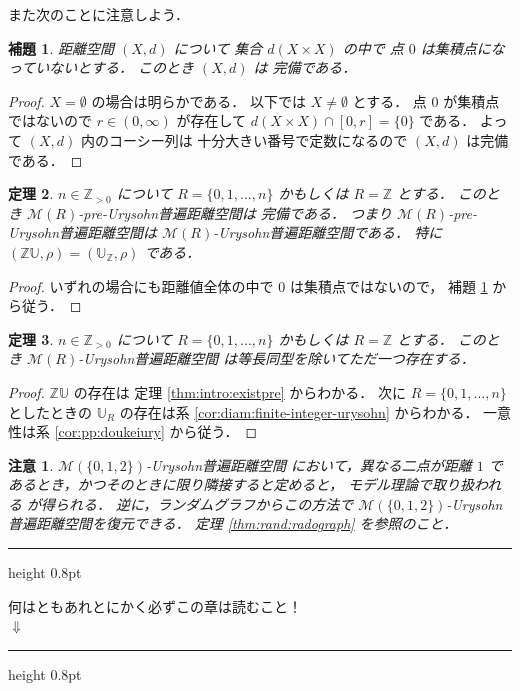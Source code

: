 \documentclass[leqno, 12pt]{jsarticle}
\newtheorem{thm}{定理}[section]
\newtheorem{lem}[thm]{補題}
\newtheorem*{rmk}{注意}
\newcommand{\zz}{\mathbb{Z}}
\newcommand{\Met}[1]{\mathscr{M}(#1)}
\newcommand{\Ury}{\mathbb{U}}
\newcommand{\UryOf}[1]{\Ury_{#1}}
\newcommand{\PreUryOf}[1]{#1\Ury}
\newcommand{\pospart}[1]{#1_{>0}}
\newcommand{\zzpos}{\pospart{\zz}}
\newenvironment{mustreadnotice}{%
  \par\bigskip
  \noindent\begin{minipage}{\textwidth}
    \hrule height 0.8pt
    \vspace{1.2em}
    \centering\Large\bfseries
}{%
    \par\vspace{1em}
    \hrule height 0.8pt
  \end{minipage}
  \par\bigskip
}
\begin{document}
また次のことに注意しよう．


\begin{lem}\label{lem:intro:completeness}
距離空間
$(X, d)$
について
集合
$d(X\times X)$
の中で
点
$0$
は集積点になっていないとする．
このとき
$(X, d)$
は
完備である．
\end{lem}
\begin{proof}
$X=\emptyset$
の場合は明らかである．
以下では
$X\neq\emptyset$
とする．
点
$0$
が集積点ではないので
$r\in (0, \infty)$
が存在して
$d(X\times X)\cap [0, r]=\{0\}$
である．
よって
$(X, d)$
内のコーシー列は
十分大きい番号で定数になるので
$(X, d)$
は完備である．
\end{proof}


\begin{thm}\label{thm:intro:integerUrysohn}
$n\in \zzpos$%
について
$R=\{0, 1, \dots, n\}$
かもしくは
$R=\zz$%
とする．
このとき
$\Met{R}$-pre-Urysohn普遍距離空間は
完備である．
つまり
$\Met{R}$-pre-Urysohn普遍距離空間は
$\Met{R}$-Urysohn普遍距離空間である．
特に
$(\PreUryOf{\zz}, \rho)=(\UryOf{\zz}, \rho)$%
である．
\end{thm}
\begin{proof}
いずれの場合にも距離値全体の中で
$0$
は集積点ではないので，
補題
\ref{lem:intro:completeness}
から従う．
\end{proof}

\begin{thm}\label{thm:intro:existintegerUrysohn}
$n\in \zzpos$
について
$R=\{0, 1, \dots, n\}$
かもしくは
$R=\zz$
とする．
このとき
$\Met{R}$-Urysohn普遍距離空間
は等長同型を除いてただ一つ存在する．
\end{thm}
\begin{proof}
$\PreUryOf{\zz}$%
の存在は
定理
\ref{thm:intro:existpre}
からわかる．
次に
$R=\{0, 1, \dots, n\}$
としたときの
$\UryOf{R}$
の存在は系
\ref{cor:diam:finite-integer-urysohn}
からわかる．
一意性は系
\ref{cor:pp:doukeiury}
から従う．
\end{proof}


\begin{rmk}\label{rmk:intro:random-graph}
$\Met{\{0,1,2\}}$-Urysohn普遍距離空間
において，異なる二点が距離
$1$
であるとき，かつそのときに限り隣接すると定めると，
モデル理論で取り扱われる
が得られる．
逆に，ランダムグラフからこの方法で
$\Met{\{0,1,2\}}$-Urysohn普遍距離空間を復元できる．
定理
\ref{thm:rand:radograph}
を参照のこと．
\end{rmk}

\begin{mustreadnotice}
何はともあれとにかく必ずこの章は読むこと！\\[0.7em]
$\Downarrow$
\end{mustreadnotice}
\end{document}
